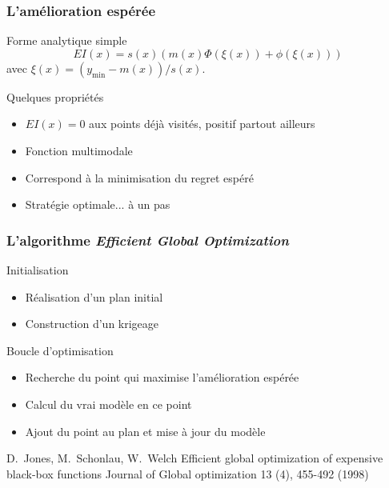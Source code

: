 \begin{frame}
\frametitle{L'amélioration espérée}
\begin{block}{Forme analytique simple}
$$EI(x) = s(x) \left( m(x)\Phi(\xi(x)) + \phi(\xi(x))\right)$$
avec $\xi(x)=(y_{\min} - m(x))/s(x)$.
\end{block}

\begin{exampleblock}{Quelques propriétés}
 \begin{itemize}
  \item $EI(x)=0$ aux points déjà visités, positif partout ailleurs
  \item Fonction multimodale
  \item Correspond à la minimisation du regret espéré
  \item Stratégie optimale... à un pas
 \end{itemize}

\end{exampleblock}

\end{frame}
\begin{frame}
\frametitle{L'algorithme \textit{Efficient Global Optimization}}

\begin{block}{Initialisation}
\begin{itemize}
 \item Réalisation d'un plan initial
 \item Construction d'un krigeage
\end{itemize} 
\end{block}

\begin{block}{Boucle d'optimisation}
\begin{itemize}
 \item Recherche du point qui maximise l'amélioration espérée
 \item Calcul du vrai modèle en ce point
 \item Ajout du point au plan et mise à jour du modèle
\end{itemize}
\end{block}

\scriptsize{
 \begin{thebibliography}{7}
\beamertemplatearticlebibitems
     D.~Jones, M.~Schonlau, W.~Welch
         \newblock Efficient global optimization of expensive black-box functions
         \newblock Journal of Global optimization 13 (4), 455-492 (1998)
 \end{thebibliography}
}
\end{frame}


